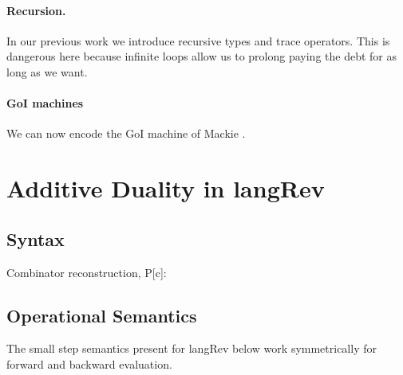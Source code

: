 \documentclass[preprint]{sigplanconf}
\begin{document}
\paragraph*{Recursion.} In our previous work we introduce recursive types and
trace operators. This is dangerous here because infinite loops allow us to
prolong paying the debt for as long as we want.


\paragraph*{GoI machines} 
We can now encode the GoI machine of Mackie \cite{Mackie2011,DBLP:conf/popl/Mackie95}.


\section{Additive Duality in {{langRev}} }

\subsection{Syntax}

%
%
%

Combinator reconstruction, {{P[c]}}:

\subsection{Operational Semantics}

The small step semantics present for {{langRev}} below work
symmetrically for forward and backward evaluation.
\end{document}
